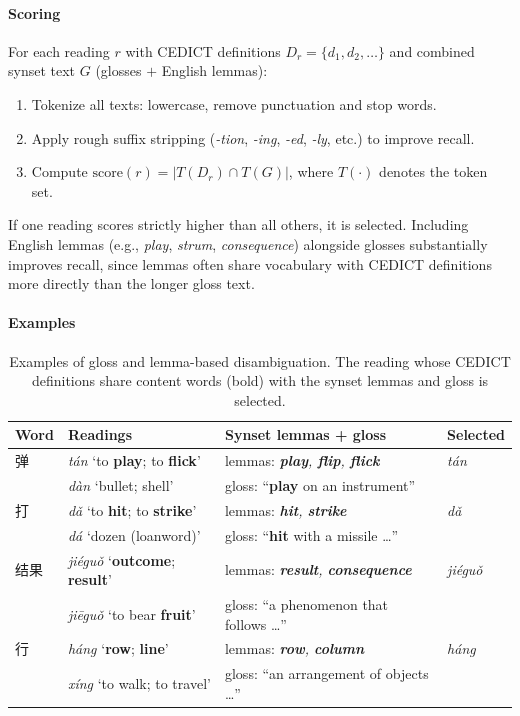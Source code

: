 \documentclass[11pt,a4paper]{article}
\begin{document}
\paragraph{Scoring} For each reading $r$ with CEDICT definitions
$D_r = \{d_1, d_2, \ldots\}$ and combined synset text $G$ (glosses
$+$ English lemmas):

\begin{enumerate}[nosep]
\item Tokenize all texts: lowercase, remove punctuation and stop words.
\item Apply rough suffix stripping (\emph{-tion}, \emph{-ing},
  \emph{-ed}, \emph{-ly}, etc.) to improve recall.
\item Compute $\mathrm{score}(r) = |T(D_r) \cap T(G)|$, where $T(\cdot)$
  denotes the token set.
\end{enumerate}

If one reading scores strictly higher than all others, it is selected.
Including English lemmas (e.g., \emph{play}, \emph{strum},
\emph{consequence}) alongside glosses substantially improves recall,
since lemmas often share vocabulary with CEDICT definitions more
directly than the longer gloss text.

\paragraph{Examples}

\begin{table}[ht]
\centering
\begin{tabular}{llll}
  \toprule
  Word & Readings & Synset lemmas + gloss & Selected \\
  \midrule
  弹 & \emph{tán} `to \textbf{play}; to \textbf{flick}' & lemmas: \emph{\textbf{play}, \textbf{flip}, \textbf{flick}} & \emph{tán} \\
     & \emph{dàn} `bullet; shell' & gloss: ``\textbf{play} on an instrument'' & \\[4pt]
  打 & \emph{dǎ} `to \textbf{hit}; to \textbf{strike}' & lemmas: \emph{\textbf{hit}, \textbf{strike}} & \emph{dǎ} \\
     & \emph{dá} `dozen (loanword)' & gloss: ``\textbf{hit} with a missile \ldots'' & \\[4pt]
  结果 & \emph{jiéguǒ} `\textbf{outcome}; \textbf{result}' & lemmas: \emph{\textbf{result}, \textbf{consequence}} & \emph{jiéguǒ} \\
       & \emph{jiēguǒ} `to bear \textbf{fruit}' & gloss: ``a phenomenon that follows \ldots'' & \\[4pt]
  行 & \emph{háng} `\textbf{row}; \textbf{line}' & lemmas: \emph{\textbf{row}, \textbf{column}} & \emph{háng} \\
     & \emph{xíng} `to walk; to travel' & gloss: ``an arrangement of objects \ldots'' & \\
  \bottomrule
\end{tabular}
\caption{Examples of gloss and lemma-based disambiguation.  The
  reading whose CEDICT definitions share content words (bold) with
  the synset lemmas and gloss is selected.}
\label{tab:examples}
\end{table}
\end{document}
